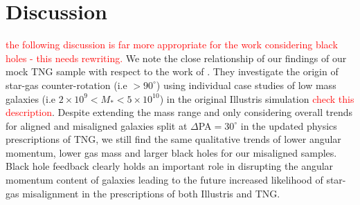 \documentclass[fleqn,usenatbib]{mnras}
\newcommand{\red}[1]{{\textcolor{red}{#1}}}
\begin{document}




\section{Discussion} \label{sec:discussion}
\red{the following discussion is far more appropriate for the work considering black holes - this needs rewriting.}
We note the close relationship of our findings of our mock TNG sample with respect to the work of \citet{starkenburg+19}. They investigate the origin of star-gas counter-rotation (i.e $ > 90^{\circ}$) using individual case studies of low mass galaxies (i.e $2 \times 10^{9} < M_{\ast} < 5 \times 10^{10}$) in the original Illustris simulation \red{check this description}. Despite extending the mass range and only considering overall trends for aligned and misaligned galaxies split at $\Delta$PA$= 30^{\circ}$ in the updated physics prescriptions of TNG, we still find the same qualitative trends of lower angular momentum, lower gas mass and larger black holes for our misaligned samples. Black hole feedback clearly holds an important role in disrupting the angular momentum content of galaxies leading to the future increased likelihood of star-gas misalignment in the prescriptions of both Illustris and TNG. 
\end{document}
